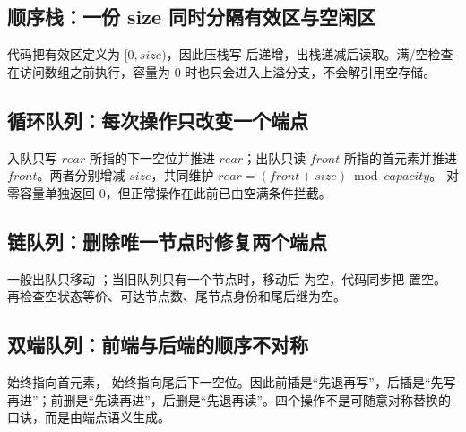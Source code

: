 \documentclass[UTF8,fontset=none,11pt,a4paper]{ctexart}
\begin{document}
\subsection{顺序栈：一份 size 同时分隔有效区与空闲区}


代码把有效区定义为 $[0,size)$，因此压栈写  后递增，出栈递减后读取。满/空检查在访问数组之前执行，容量为 0 时也只会进入上溢分支，不会解引用空存储。

\subsection{循环队列：每次操作只改变一个端点}


入队只写 $rear$ 所指的下一空位并推进 $rear$；出队只读 $front$ 所指的首元素并推进 $front$。两者分别增减 $size$，共同维护 $rear=(front+size)\bmod capacity$。 对零容量单独返回 0，但正常操作在此前已由空满条件拦截。

\subsection{链队列：删除唯一节点时修复两个端点}


一般出队只移动 ；当旧队列只有一个节点时，移动后  为空，代码同步把  置空。 再检查空状态等价、可达节点数、尾节点身份和尾后继为空。

\subsection{双端队列：前端与后端的顺序不对称}


 始终指向首元素， 始终指向尾后下一空位。因此前插是“先退再写”，后插是“先写再进”；前删是“先读再进”，后删是“先退再读”。四个操作不是可随意对称替换的口诀，而是由端点语义生成。
\end{document}
